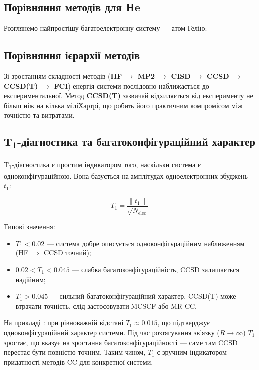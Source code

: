 

\subsection{Порівняння методів для He}

Розглянемо найпростішу багатоелектронну систему --- атом Гелію:


\subsection{Порівняння ієрархії методів}



Зі зростанням складності методів (\textbf{HF $\to$ MP2 $\to$  CISD $\to$  CCSD $\to$  CCSD(T) $\to$  FCI})
енергія системи послідовно наближається до експериментальної.
Метод \textbf{CCSD(T)} зазвичай відхиляється від експерименту не більш ніж на кілька міліХартрі,
що робить його практичним компромісом між точністю та витратами.



\subsection{T\textsubscript{1}-діагностика та багатоконфігураційний характер}

T\textsubscript{1}-діагностика є простим індикатором того, наскільки система є одноконфігураційною.
Вона базується на амплітудах одноелектронних збуджень $t_1$:

\begin{equation}
    T_1 = \frac{\|t_1\|}{\sqrt{N_{\text{elec}}}}
\end{equation}



Типові значення:
\begin{itemize}
    \item $T_1 < 0.02$ — система добре описується одноконфігураційним наближенням (HF $\Rightarrow$ CCSD точний);
    \item $0.02 < T_1 < 0.045$ — слабка багатоконфігураційність, CCSD залишається надійним;
    \item $T_1 > 0.045$ — сильний багатоконфігураційний характер, CCSD(T) може втрачати точність, слід застосовувати MCSCF або MR-CC.
\end{itemize}

На прикладі : при рівноважній відстані $T_1 \approx 0.015$,
що підтверджує одноконфігураційний характер системи.
Під час розтягування зв’язку ($R \to \infty$) $T_1$ зростає, що вказує на
зростання багатоконфігураційності --- саме там CCSD перестає бути повністю точним.
Таким чином, $T_1$ є зручним індикатором придатності методів CC для конкретної системи.

